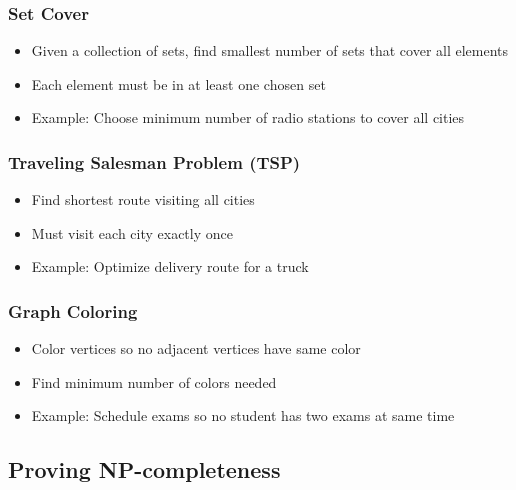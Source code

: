 \documentclass[11pt,a4paper]{article}
\begin{document}
\begin{multicols}{2}
\subsubsection{Set Cover}
\begin{itemize}
    \item Given a collection of sets, find smallest number of sets that cover all elements
    \item Each element must be in at least one chosen set
    \item Example: Choose minimum number of radio stations to cover all cities
\end{itemize}

\subsubsection{Traveling Salesman Problem (TSP)}
\begin{itemize}
    \item Find shortest route visiting all cities
    \item Must visit each city exactly once
    \item Example: Optimize delivery route for a truck
\end{itemize}

\subsubsection{Graph Coloring}
\begin{itemize}
    \item Color vertices so no adjacent vertices have same color
    \item Find minimum number of colors needed
    \item Example: Schedule exams so no student has two exams at same time
\end{itemize}

\subsection{Proving NP-completeness}

\end{multicols}
\end{document}
